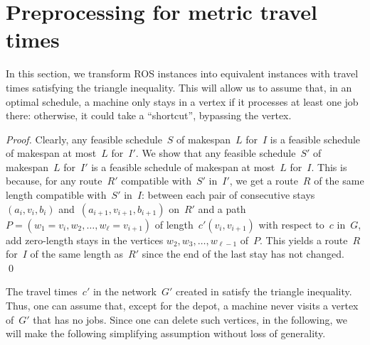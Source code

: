 \documentclass[natbib,sort,smallextended,envcountsame,envcountsect,numbook]{svjour3}
\newcommand{\ROS}{\textsc{ROS}}
\newcommand{\dist}{\text{dist}}
\newcommand{\Gr}{G}
\begin{document}
\section{Preprocessing for metric travel times}\label{sec:preprop}
\noindent
In this section,
we transform \ROS{} instances
into equivalent instances
with travel times
satisfying the triangle inequality.
This will allow us to assume that,
in an optimal schedule,
a machine only stays in a vertex
if it processes at least one job there:
otherwise, it could take a ``shortcut'',
bypassing the vertex.


\begin{proof}
  Clearly, any feasible schedule~\(S\) of makespan~\(L\) for~\(I\)
  is a feasible schedule of makespan at most~\(L\) for~\(I'\). We show that any feasible schedule~\(S'\) of makespan~\(L\) for~\(I'\)
  is a feasible schedule of makespan at most~\(L\) for~\(I\).
  This is because, for any route~\(R'\) compatible with~\(S'\)
  in~\(I'\),
  we get a route~\(R\) of the same length compatible with~\(S'\) in~\(I\):
  between each pair of consecutive
  stays~\((a_i,v_i,b_i)\) and~\((a_{i+1},v_{i+1},b_{i+1})\) on~\(R'\)
  and a path~\(P=(w_1=v_i,w_2,\dots,w_\ell=v_{i+1})\)
  of length~\(c'(v_i,v_{i+1})\)
  with respect to~\(c\)  in~\(\Gr\),
  add zero-length stays in the vertices
  \(w_2,w_3,\dots,w_{\ell-1}\)
  of~\(P\).  This yields a route~\(R\) for~\(I\)
  of the same length as~\(R'\) since the end of the last stay has not changed.
\qed\end{proof}

\noindent
The travel times~\(c'\)
in the network~\(\Gr'\) created in 
satisfy the triangle inequality.
Thus,
one can assume that, except for the depot, a machine
never visits a vertex of~\(\Gr'\) that has no jobs.
Since one can delete such vertices,
in the following,
we will make the
following simplifying assumption without loss of generality.
\end{document}
